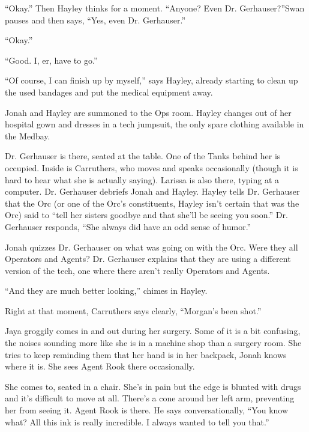 ``Okay.''  Then Hayley thinks for a moment.  ``Anyone?  Even Dr. Gerhauser?''Swan pauses and then says, ``Yes, even Dr. Gerhauser.''

``Okay.''

``Good.  I, er, have to go.''

``Of course, I can finish up by myself,'' says Hayley, already starting to clean up the used bandages and put the medical equipment away.



Jonah and Hayley are summoned to the Ops room.  Hayley changes out of her hospital gown and dresses in a tech jumpsuit, the only spare clothing available in the Medbay.



Dr. Gerhauser is there, seated at the table.  One of the Tanks behind her is occupied.  Inside is Carruthers, who moves and speaks occasionally (though it is hard to hear what she is actually saying).  Larissa is also there, typing at a computer.  Dr. Gerhauser debriefs Jonah and Hayley.  Hayley tells Dr. Gerhauser that the Orc (or one of the Orc's constituents, Hayley isn't certain that was the Orc) said to ``tell her sisters goodbye and that she'll be seeing you soon.''  Dr. Gerhauser responds, ``She always did have an odd sense of humor.''



Jonah quizzes Dr. Gerhauser on what was going on with the Orc.  Were they all Operators and Agents?  Dr. Gerhauser explains that they are using a different version of the tech, one where there aren't really Operators and Agents.

``And they are much better looking,'' chimes in Hayley.

Right at that moment, Carruthers says clearly, ``Morgan's been shot.''





Jaya groggily comes in and out during her surgery.  Some of it is a bit confusing, the noises sounding more like she is in a machine shop than a surgery room.  She tries to keep reminding them that her hand is in her backpack, Jonah knows where it is.  She sees Agent Rook there occasionally.



She comes to, seated in a chair.  She's in pain but the edge is blunted with drugs and it's difficult to move at all.  There's a cone around her left arm, preventing her from seeing it.  Agent Rook is there.  He says conversationally, ``You know what?  All this ink is really incredible.  I always wanted to tell you that.''


